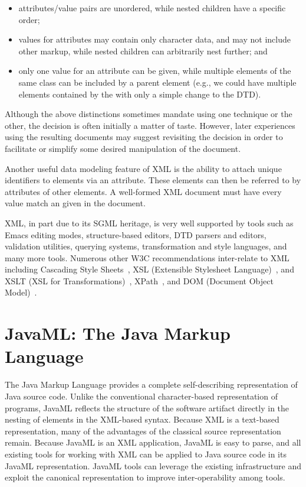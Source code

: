 \documentclass{article}
\begin{document}
\begin{itemize}

\item attributes/value pairs are unordered, while nested children have a
specific order;

\item values for attributes may contain only character data, and may not
      include other markup, while nested children can arbitrarily nest
      further; and
      
\item only one value for an attribute can be given, while multiple
      elements of the same class can be included by a parent element
      (e.g., we could have multiple  elements contained by
      the  with only a simple change to the DTD).

\end{itemize}

Although the above distinctions sometimes mandate using one technique or
the other, the decision is often initially a matter of taste.  However,
later experiences using the resulting documents may suggest revisiting
the decision in order to facilitate or simplify some desired
manipulation of the document.

Another useful data modeling feature of XML is the ability to attach
unique identifiers to elements via an  attribute.  These
elements can then be referred to by  attributes of other
elements.  A well-formed XML document must have every 
value match an  given in the document.

XML, in part due to its SGML heritage, is very well supported by tools
such as Emacs editing modes, structure-based editors, DTD parsers and
editors, validation utilities, querying systems, transformation and
style languages, and many more tools.  Numerous other W3C
recommendations inter-relate to XML including Cascading Style
Sheets~\cite{CSS2}, XSL (Extensible Stylesheet Language)~\cite{XSL}, and
XSLT (XSL for Transformations)~\cite{XSLT}, XPath~\cite{XPath}, and DOM
(Document Object Model)~\cite{DOM}.

\section{JavaML: The Java Markup Language}
\label{sec-javaml}

The Java Markup Language provides a complete self-describing
representation of Java source code.  Unlike the conventional
character-based representation of programs, JavaML reflects the
structure of the software artifact directly in the nesting of elements
in the XML-based syntax.  Because XML is a text-based representation,
many of the advantages of the classical source representation remain.
Because JavaML is an XML application, JavaML is easy to parse, and all
existing tools for working with XML can be applied to Java source code
in its JavaML representation.  JavaML tools can leverage the existing
infrastructure and exploit the canonical representation to improve
inter-operability among tools.
\end{document}
